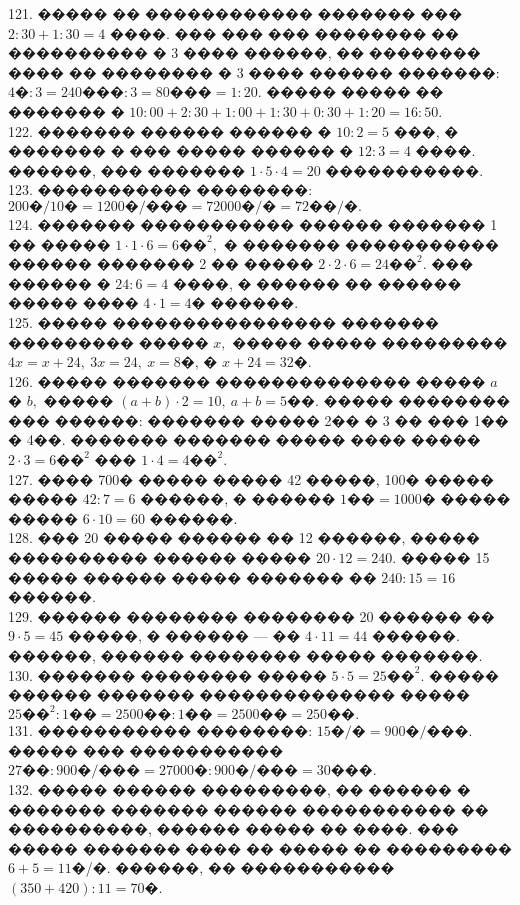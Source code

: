 \documentclass[12pt]{article}
\begin{document}
121. ����� �� ������������ ������� ��� $2:30+1:30=4$ ����. ��� ��� ��� �������� �� ���������� � 3 ���� ������, �� �������� ���� �� �������� � 3 ���� ������ �������: $4\text{�}:3=240\text{���}:3=80\text{���}=1:20.$ ����� ����� �� ������� � $10:00+2:30+1:00+1:30+0:30+1:20=16:50.$\\
122. ������� ������ ������ � $10:2=5$ ���, � ������� � ��� ����� ������ � $12:3=4$ ����. ������, ��� ������� $1\cdot5\cdot4=20$ �����������.\\
123. ����������� ��������: $200\text{�}/10\text{�}=1200\text{�}/\text{���}=72000\text{�}/\text{�}=72\text{��}/\text{�}.$\\
124. ������� ����������� ������ ������� 1 �� ����� $1\cdot1\cdot6=6\text{��}^2,$ � ������� ����������� ������ ������� 2 �� ����� $2\cdot2\cdot6=24\text{��}^2.$ ��� ������ � $24:6=4$ ����, � ������ �� ������ ����� ���� $4\cdot1=4$� ������.\\
125. ����� ���������������� ������� ��������� ����� $x,$ ����� ����� ��������� $4x=x+24,\ 3x=24,\ x=8$�, � $x+24=32$�.\\
126. ����� ������� �������������� ����� $a$ � $b,$ ����� $(a+b)\cdot2=10,\ a+b=5$��. ����� �������� ��� ������: ������� ����� 2�� � 3 �� ��� 1�� � 4��. ������� ������� ����� ���� ����� $2\cdot3=6\text{��}^2$ ��� $1\cdot4=4\text{��}^2.$\\
127. ���� 700� ����� ����� 42 �����, 100� ����� ����� $42:7=6$ ������, � ������ $1\text{��}=1000$� ����� ����� $6\cdot10=60$ ������.\\
128. ��� 20 ����� ������ �� 12 ������, ����� ���������� ������ ����� $20\cdot12=240.$ ����� 15 ����� ������ ����� ������� �� $240:15=16$ ������.\\
129. ������ �������� �������� 20 ������ �� $9\cdot5=45$ �����, � ������ --- �� $4\cdot11=44$ ������. ������, ������ �������� ����� �������.\\
130. ������� �������� ����� $5\cdot5=25\text{��}^2.$ ����� ������ ������� �������������� ����� $25\text{��}^2:1\text{��}=2500\text{��}:1\text{��}=2500\text{��}=250\text{��}.$\\
131. ����������� ��������: $15\text{�}/\text{�}=900\text{�}/\text{���}.$ ����� ��� ����������� $27\text{��}:900\text{�}/\text{���}=
27000\text{�}:900\text{�}/\text{���}=30$���.\\
132. ����� ������ ���������, �� ������ � ������� ������� ������ ����������� �� ����������, ������ ����� �� ����. ��� ����� ������� ���� �� ����� �� ��������� $6+5=11$�/�. ������, �� ����������� $(350+420):11=70$�.\\
\end{document}

